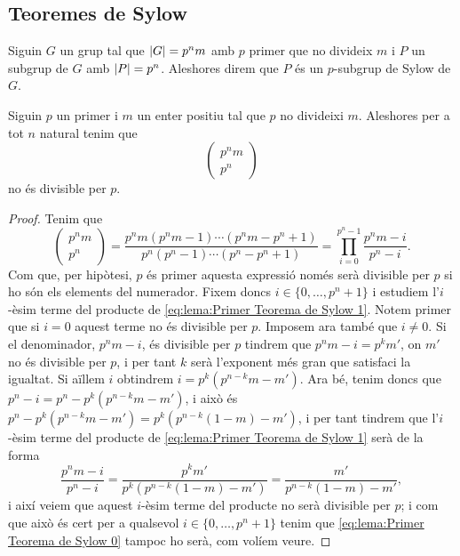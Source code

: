 \documentclass[../Apunts.tex]{subfiles}
\begin{document}
	\subsection{Teoremes de Sylow}
	\begin{definition}
		\label{def:p-subgrup de Sylow}
		Siguin \(G\) un grup tal que \(\abs{G}=p^{n}m\) amb \(p\) primer que no divideix \(m\) i \(P\) un subgrup de \(G\) amb \(\abs{P}=p^{n}\). Aleshores direm que \(P\) és un \(p\)-subgrup de Sylow de \(G\).
	\end{definition}
	\begin{lemma}
		\label{lema:Primer Teorema de Sylow}
		Siguin \(p\) un primer i \(m\) un enter positiu tal que \(p\) no divideixi \(m\). Aleshores per a tot \(n\) natural tenim que
		\begin{equation}
		\left(\begin{matrix}
		\label{eq:lema:Primer Teorema de Sylow 0}
		p^{n}m\\p^{n}
		\end{matrix}\right)
		\end{equation}
		no és divisible per \(p\).
		\begin{proof}
			Tenim que
			\begin{equation}
		\label{eq:lema:Primer Teorema de Sylow 1}
			\left(\begin{matrix}
			p^{n}m\\p^{n}
			\end{matrix}\right)
			=\frac{p^{n}m(p^{n}m-1)\cdots(p^{n}m-p^{n}+1)}{p^{n}(p^{n}-1)\cdots(p^{n}-p^{n}+1)}=\prod_{i=0}^{p^{n}-1}\frac{p^{n}m-i}{p^{n}-i}.
			\end{equation}
			Com que, per hipòtesi, \(p\) és primer aquesta expressió només serà divisible per \(p\) si ho són els elements del numerador. Fixem doncs \(i\in\{0,\dots,p^{n}+1\}\) i estudiem l'\(i\)-èsim terme del producte de \eqref{eq:lema:Primer Teorema de Sylow 1}. Notem primer que si \(i=0\) aquest terme no és divisible per \(p\). Imposem ara també que \(i\neq0\). Si el denominador, \(p^{n}m-i\), és divisible per \(p\) tindrem que \(p^{n}m-i=p^{k}m'\), on \(m'\) no és divisible per \(p\), i per tant \(k\) serà l'exponent més gran que satisfaci la igualtat. Si aïllem \(i\) obtindrem \(i=p^{k}(p^{n-k}m-m')\). Ara bé, tenim doncs que \(p^{n}-i=p^{n}-p^{k}(p^{n-k}m-m')\), i això és \(p^{n}-p^{k}(p^{n-k}m-m')=p^{k}(p^{n-k}(1-m)-m')\), i per tant tindrem que l'\(i\)-èsim terme del producte de \eqref{eq:lema:Primer Teorema de Sylow 1} serà de la forma
			\[\frac{p^{n}m-i}{p^{n}-i}=\frac{p^{k}m'}{p^{k}(p^{n-k}(1-m)-m')}=\frac{m'}{p^{n-k}(1-m)-m'},\]
			i així veiem que aquest \(i\)-èsim terme del producte no serà divisible per \(p\); i com que això és cert per a qualsevol \(i\in\{0,\dots,p^{n}+1\}\) tenim que \eqref{eq:lema:Primer Teorema de Sylow 0} tampoc ho serà, com volíem veure.
		\end{proof}
	\end{lemma}
\end{document}
